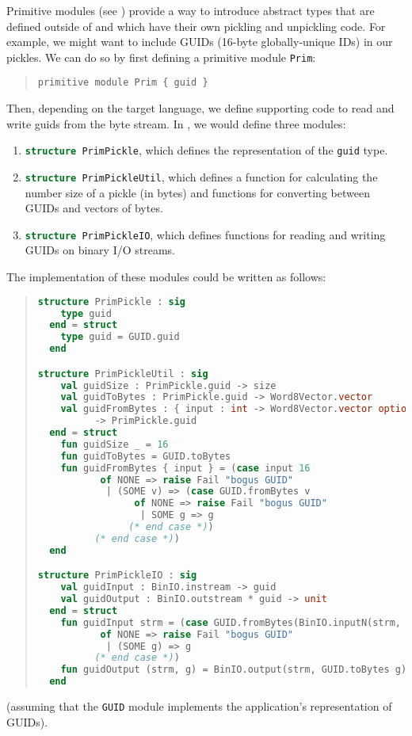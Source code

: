 Primitive modules (see ) provide a way to introduce abstract
types that are defined outside
of \asdl{} and which have their own pickling and unpickling code.
For example, we might want to include GUIDs (16-byte globally-unique IDs) in our pickles.
We can do so by first defining a primitive module \lstinline!Prim!:
%
\begin{quote}\begin{lstlisting}[language=ASDL]
primitive module Prim { guid }
\end{lstlisting}\end{quote}%
%
Then, depending on the target language, we define
supporting code to read and write guids from the byte stream.
In \sml{}, we would define three modules:
\begin{enumerate}
  \item \lstinline[language=SML]!structure PrimPickle!, which defines the representation of the
    \lstinline[language=SML]!guid! type.
  \item
    \lstinline[language=SML]!structure PrimPickleUtil!, which defines a function for calculating
    the number size of a pickle (in bytes) and functions for converting between GUIDs and
    vectors of bytes.
  \item
    \lstinline[language=SML]!structure PrimPickleIO!, which defines functions for reading
    and writing GUIDs on binary I/O streams.
\end{enumerate}%
The \sml{} implementation of these modules could be written as follows:
\begin{quote}\begin{lstlisting}[language=SML]
structure PrimPickle : sig
    type guid
  end = struct
    type guid = GUID.guid
  end

structure PrimPickleUtil : sig
    val guidSize : PrimPickle.guid -> size
    val guidToBytes : PrimPickle.guid -> Word8Vector.vector
    val guidFromBytes : { input : int -> Word8Vector.vector option }
          -> PrimPickle.guid
  end = struct
    fun guidSize _ = 16
    fun guidToBytes = GUID.toBytes
    fun guidFromBytes { input } = (case input 16
           of NONE => raise Fail "bogus GUID"
	        | (SOME v) => (case GUID.fromBytes v
                 of NONE => raise Fail "bogus GUID"
	              | SOME g => g
                (* end case *))
	      (* end case *))
  end

structure PrimPickleIO : sig
    val guidInput : BinIO.instream -> guid
    val guidOutput : BinIO.outstream * guid -> unit
  end = struct
    fun guidInput strm = (case GUID.fromBytes(BinIO.inputN(strm, 16))
	       of NONE => raise Fail "bogus GUID"
	        | (SOME g) => g
	      (* end case *))
    fun guidOutput (strm, g) = BinIO.output(strm, GUID.toBytes g)
  end
\end{lstlisting}\end{quote}%
(assuming that the \lstinline!GUID! module implements the application's representation
of GUIDs).

